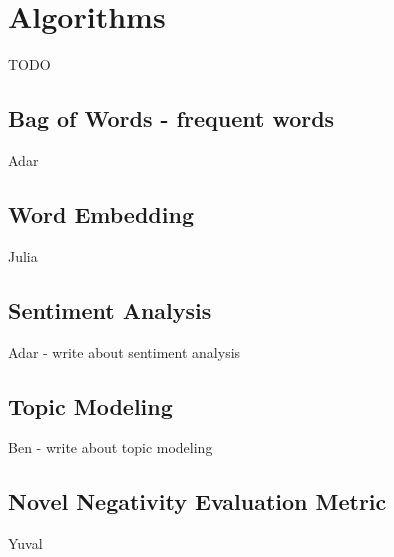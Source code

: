 \section{Algorithms}
TODO


\subsection{Bag of Words - frequent words}
Adar

\subsection{Word Embedding}
Julia

\subsection{Sentiment Analysis}
Adar - write about sentiment analysis

\subsection{Topic Modeling}
Ben - write about topic modeling

\subsection{Novel Negativity Evaluation Metric}
Yuval